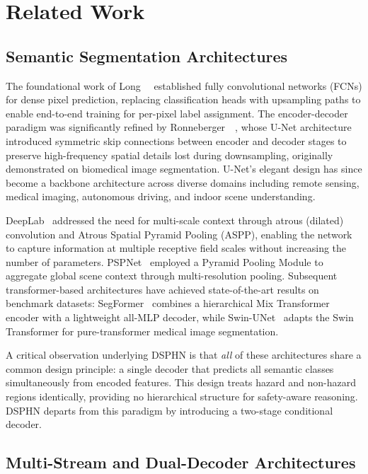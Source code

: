 \section{Related Work}
\label{sec:related}

\subsection{Semantic Segmentation Architectures}

The foundational work of Long~\etal~\cite{long2015fully} established
fully convolutional networks (FCNs) for dense pixel prediction,
replacing classification heads with upsampling paths to enable
end-to-end training for per-pixel label assignment. The
encoder-decoder paradigm was significantly refined by
Ronneberger~\etal~\cite{ronneberger2015unet}, whose U-Net
architecture introduced symmetric skip connections between encoder
and decoder stages to preserve high-frequency spatial details
lost during downsampling, originally demonstrated on biomedical
image segmentation. U-Net's elegant design has since become
a backbone architecture across diverse domains including remote
sensing, medical imaging, autonomous driving, and indoor scene
understanding.

DeepLab~\cite{chen2017deeplab} addressed the need for multi-scale
context through atrous (dilated) convolution and Atrous Spatial
Pyramid Pooling (ASPP), enabling the network to capture information
at multiple receptive field scales without increasing the number
of parameters. PSPNet~\cite{zhao2017pyramid} employed a Pyramid
Pooling Module to aggregate global scene context through
multi-resolution pooling. Subsequent transformer-based architectures
have achieved state-of-the-art results on benchmark datasets:
SegFormer~\cite{xie2021segformer} combines a hierarchical Mix
Transformer encoder with a lightweight all-MLP decoder, while
Swin-UNet~\cite{cao2022swinunet} adapts the Swin Transformer
for pure-transformer medical image segmentation.

A critical observation underlying DSPHN is that \textit{all} of
these architectures share a common design principle: a single decoder
that predicts all semantic classes simultaneously from encoded
features. This design treats hazard and non-hazard regions
identically, providing no hierarchical structure for safety-aware
reasoning. DSPHN departs from this paradigm by introducing a
two-stage conditional decoder.

\subsection{Multi-Stream and Dual-Decoder Architectures}

